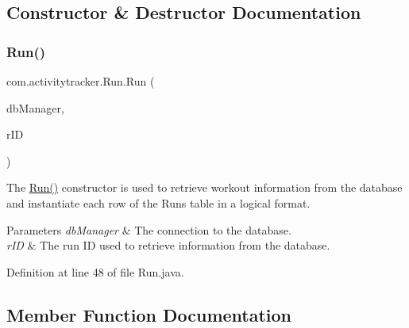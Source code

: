 \subsection{Constructor \& Destructor Documentation}
\mbox{\label{classcom_1_1activitytracker_1_1_run_a5568c1c514835056d2abc22cfba222c5}} 
\subsubsection{\texorpdfstring{Run()}{Run()}}
{\footnotesize\ttfamily com.\+activitytracker.\+Run.\+Run (\begin{DoxyParamCaption}\item[{final \mbox{\hyperlink{classcom_1_1activitytracker_1_1_d_b_manager}{D\+B\+Manager}}}]{db\+Manager,  }\item[{final int}]{r\+ID }\end{DoxyParamCaption})\hspace{0.3cm}{\ttfamily [package]}}

The \mbox{\hyperlink{classcom_1_1activitytracker_1_1_run_a5568c1c514835056d2abc22cfba222c5}{Run()}} constructor is used to retrieve workout information from the database and instantiate each row of the Runs table in a logical format.


\begin{DoxyParams}{Parameters}
{\em db\+Manager} & The connection to the database. \\
\hline
{\em r\+ID} & The run ID used to retrieve information from the database. \\
\hline
\end{DoxyParams}


Definition at line 48 of file Run.\+java.



\subsection{Member Function Documentation}
\mbox{\label{classcom_1_1activitytracker_1_1_run_a238cc6c056460ead34475961a7c9a00c}} 
